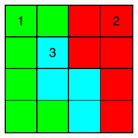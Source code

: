 \begin{frame}
\begin{columns}
\begin{overprint}
		\centering\includegraphics[width=0.9\textwidth]{images/expansion-5.pdf}
	\end{overprint}
	
	\end{columns}

\end{frame}

